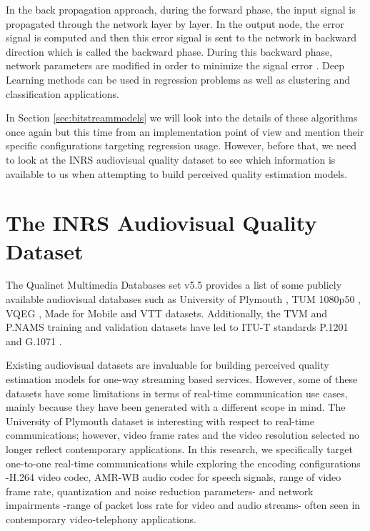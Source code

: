 \documentclass[journal]{IEEEtran}
\begin{document}
In the back propagation approach, during the forward phase, the input signal is propagated through the network layer by layer. In the output node, the error signal is computed and then this error signal is sent to the network in backward direction which is called the backward phase. During this backward phase, network parameters are modified in order to minimize the signal error \cite{du2009research}. Deep Learning methods can be used in regression problems as well as clustering and classification applications.

In Section \ref{sec:bitstreammodels} we will look into the details of these algorithms once again but this time from an implementation point of view and mention their specific configurations targeting regression usage. However, before that, we need to look at the INRS audiovisual quality dataset to see which information is available to us when attempting to build perceived quality estimation models.

\vspace{-0.2cm}
\newcommand{\frigginfigurewidth}{2.4in}
\section{The INRS Audiovisual Quality Dataset}
\label{sec:dataset}

The Qualinet Multimedia Databases set v5.5 \cite{fliegel2014qualinet} provides a list of some publicly available audiovisual databases such as University of Plymouth \cite{goudarzi2010audiovisual}, TUM 1080p50 \cite{keimel2012tum}, VQEG \cite{pinson2012influence}, Made for Mobile \cite{robitza2012made} and VTT \cite{maki2013reduced} datasets. Additionally, the TVM and P.NAMS training and validation datasets \cite{garcia2014parametric} have led to ITU-T standards P.1201 \cite{itut2012P.1201} and G.1071 \cite{itut2015G.1071}.

Existing audiovisual datasets are invaluable for building perceived quality estimation models for one-way streaming based services. However, some of these datasets have some limitations in terms of real-time communication use cases, mainly because they have been generated with a different scope in mind. The University of Plymouth dataset is interesting with respect to real-time communications; however, video frame rates and the video resolution selected no longer reflect contemporary applications. In this research, we specifically target one-to-one real-time communications while exploring the encoding configurations -H.264 video codec, AMR-WB audio codec for speech signals, range of video frame rate, quantization and noise reduction parameters- and network impairments -range of packet loss rate for video and audio streams- often seen in contemporary video-telephony applications.
\end{document}
